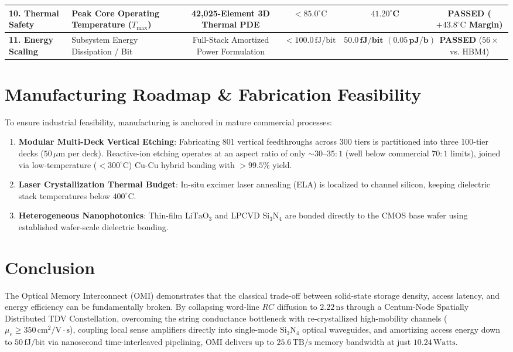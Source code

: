 \documentclass[journal]{IEEEtran}
\begin{document}
\begin{table}[!t]
{\begin{tabular}{llcccc}
\midrule
\textbf{10. Thermal Safety} & Peak Core Operating Temperature ($T_{\max}$) & 42,025-Element 3D Thermal PDE & $< 85.0^\circ\text{C}$ & $\mathbf{41.20^\circ\text{C}}$ & \textbf{PASSED} ($+43.8^\circ\text{C}$ Margin) \\
\midrule
\textbf{11. Energy Scaling} & Subsystem Energy Dissipation / Bit & Full-Stack Amortized Power Formulation & $< 100.0\,\text{fJ/bit}$ & $\mathbf{50.0\,\text{fJ/bit } (0.05\,\text{pJ/b})}$ & \textbf{PASSED} ($56\times$ vs. HBM4) \\
\bottomrule
\end{tabular}
}
\end{table}

\section{Manufacturing Roadmap \& Fabrication Feasibility}
To ensure industrial feasibility, manufacturing is anchored in mature commercial processes:
\begin{enumerate}
    \item \textbf{Modular Multi-Deck Vertical Etching}: Fabricating 801 vertical feedthroughs across 300 tiers is partitioned into three 100-tier decks ($50\,\mu\text{m}$ per deck). Reactive-ion etching operates at an aspect ratio of only $\sim 30\text{--}35:1$ (well below commercial $70:1$ limits), joined via low-temperature ($<300^\circ\text{C}$) Cu-Cu hybrid bonding with $>99.5\%$ yield.
    \item \textbf{Laser Crystallization Thermal Budget}: In-situ excimer laser annealing (ELA) is localized to channel silicon, keeping dielectric stack temperatures below $400^\circ\text{C}$.
    \item \textbf{Heterogeneous Nanophotonics}: Thin-film $\text{LiTaO}_3$ and LPCVD $\text{Si}_3\text{N}_4$ are bonded directly to the CMOS base wafer using established wafer-scale dielectric bonding.
\end{enumerate}

\section{Conclusion}
The Optical Memory Interconnect (OMI) demonstrates that the classical trade-off between solid-state storage density, access latency, and energy efficiency can be fundamentally broken. By collapsing word-line $RC$ diffusion to $2.22\,\text{ns}$ through a Centum-Node Spatially Distributed TDV Constellation, overcoming the string conductance bottleneck with re-crystallized high-mobility channels ($\mu_e \ge 350\,\text{cm}^2/\text{V}\cdot\text{s}$), coupling local sense amplifiers directly into single-mode $\text{Si}_3\text{N}_4$ optical waveguides, and amortizing access energy down to $50\,\text{fJ/bit}$ via nanosecond time-interleaved pipelining, OMI delivers up to $25.6\,\text{TB/s}$ memory bandwidth at just $10.24\,\text{Watts}$.
\end{document}
